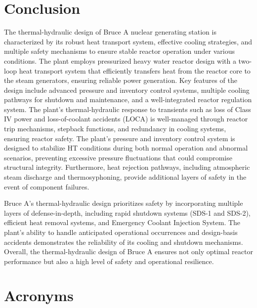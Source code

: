 \documentclass[12pt]{article}
\begin{document}
\section{Conclusion}

The thermal-hydraulic design of Bruce A nuclear generating station is characterized by its robust heat transport system, effective cooling strategies, and multiple safety mechanisms to ensure stable reactor operation under various conditions. The plant employs pressurized heavy water reactor design with a two-loop heat transport system that efficiently transfers heat from the reactor core to the steam generators, ensuring reliable power generation. Key features of the design include advanced pressure and inventory control systems, multiple cooling pathways for shutdown and maintenance, and a well-integrated reactor regulation system. The plant's thermal-hydraulic response to transients such as loss of Class IV power and loss-of-coolant accidents (LOCA) is well-managed through reactor trip mechanisms, stepback functions, and redundancy in cooling systems, ensuring reactor safety. The plant's pressure and inventory control system is designed to stabilize HT conditions during both normal operation and abnormal scenarios, preventing excessive pressure fluctuations that could compromise structural integrity. Furthermore, heat rejection pathways, including atmospheric steam discharge and thermosyphoning, provide additional layers of safety in the event of component failures.

Bruce A’s thermal-hydraulic design prioritizes safety by incorporating multiple layers of defense-in-depth, including rapid shutdown systems (SDS-1 and SDS-2), efficient heat removal systems, and Emergency Coolant Injection System. The plant's ability to handle anticipated operational occurrences and design-basis accidents demonstrates the reliability of its cooling and shutdown mechanisms. Overall, the thermal-hydraulic design of Bruce A ensures not only optimal reactor performance but also a high level of safety and operational resilience.





\section*{Acronyms}
\begin{acronym}[CANDU]
\end{acronym}
\end{document}
